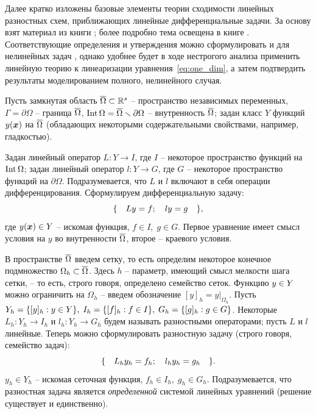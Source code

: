 Далее кратко изложены базовые элементы теории сходимости линейных разностных схем, приближающих линейные дифференциальные задачи. За основу взят материал из книги \cite[глава 10]{bahvalov_computational_methods}; более подробно тема освещена в книге \cite[глава IX]{kalitkin_computational_methods}. Соответствующие определения и утверждения можно сформулировать и для нелинейных задач \cite{kalitkin_computational_methods}, однако удобнее будет в ходе нестрогого анализа применить линейную теорию к линеаризации уравнения~\eqref{eq:one_dim}, а затем подтвердить результаты моделированием полного, нелинейного случая.

Пусть замкнутая область ${\overline{\Omega}} \subset {\mathbb{R}}^s$ -- пространство независимых переменных, $\Gamma = \partial \Omega$ -- граница ${\overline{\Omega}}$, $\operatorname{{Int}} \Omega = {\overline{\Omega}} \smallsetminus \partial \Omega$ -- внутренность ${\overline{\Omega}}$; задан класс $Y$ функций $y({\boldsymbol{x}})$ на ${\overline{\Omega}}$ (обладающих некоторыми содержательными свойствами, например, гладкостью).

Задан линейный оператор $L: Y \to I$, где $I$ -- некоторое пространство функций на $\operatorname{{Int}} \Omega$; задан линейный оператор $l: Y \to G$, где $G$ -- некоторое пространство функций на $\partial \Omega$. Подразумевается, что $L$ и $l$ включают в себя операции дифференцирования. Сформулируем дифференциальную задачу:
\begin{equation}
	\{ \quad Ly = f; \quad ly = g \quad \} {\text{,}}
	\label{eq:formal_differential}
\end{equation}
где $y({\boldsymbol{x}}) \in Y$ -- искомая функция, $f \in I, \; g \in G$. Первое уравнение имеет смысл условия на $y$ во внутренности ${\overline{\Omega}}$, второе -- краевого условия.

В пространстве ${\overline{\Omega}}$ введем сетку, то есть определим некоторое конечное подмножество $\Omega_h \subset {\overline{\Omega}}$. Здесь $h$ -- параметр, имеющий смысл мелкости шага сетки, -- то есть, строго говоря, определено семейство сеток. Функцию $y \hm \in Y$ можно ограничить на $\Omega_h$ -- введем обозначение $[y]_h = y|_{\Omega_h}$. Пусть $Y_h \hm = \{[y]_h: y \in Y\}, \; I_h = \{[f]_h: f \in I\}, \; G_h = \{[g]_h: g \in G\}$. Некоторые $L_h: Y_h \to I_h$ и $l_h: Y_h \to G_h$ будем называть разностными операторами; пусть $L$ и $l$ линейные. Теперь можно сформулировать разностную задачу (строго говоря, семейство задач):
\begin{equation}
	\{ \quad L_h y_h = f_h; \quad l_h y_h = g_h \quad \} {\text{.}}
	\label{eq:formal_subtractive}
\end{equation}
$y_h \in Y_h$ -- искомая сеточная функция, $f_h \in I_h, \; g_h \in G_h$. Подразумевается, что разностная задача является \emph{определенной} системой линейных уравнений (решение существует и единственно).

